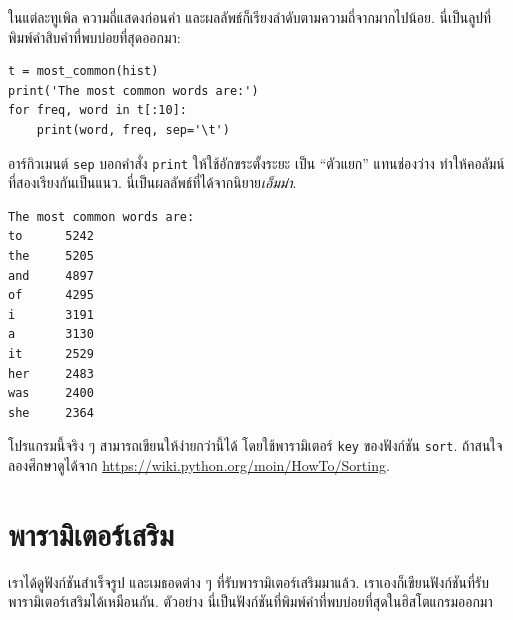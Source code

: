 
ในแต่ละทูเพิล ความถี่แสดงก่อนคำ 
และผลลัพธ์ก็เรียงลำดับตามความถี่จากมากไปน้อย.
นี่เป็นลูปที่พิมพ์คำสิบคำที่พบบ่อยที่สุดออกมา:

\begin{verbatim}
t = most_common(hist)
print('The most common words are:')
for freq, word in t[:10]:
    print(word, freq, sep='\t')
\end{verbatim}
%
%
อาร์กิวเมนต์ \texttt{sep} บอกคำสั่ง \texttt{print} ให้ใช้อักขระตั้งระยะ
เป็น ``ตัวแยก'' แทนช่องว่าง
ทำให้คอลัมน์ที่สองเรียงกันเป็นแนว.
นี่เป็นผลลัพธ์ที่ได้จากนิยาย\textit{เอ็มม่า}. 

\begin{verbatim}
The most common words are:
to      5242
the     5205
and     4897
of      4295
i       3191
a       3130
it      2529
her     2483
was     2400
she     2364
\end{verbatim}
%
%
โปรแกรมนี้จริง ๆ สามารถเขียนให้ง่ายกว่านี้ได้ โดยใช้พารามิเตอร์ \texttt{key} ของฟังก์ชัน \texttt{sort}.
ถ้าสนใจ ลองศึกษาดูได้จาก \url{https://wiki.python.org/moin/HowTo/Sorting}.

\section{พารามิเตอร์เสริม}


เราได้ดูฟังก์ชันสำเร็จรูป และเมธอดต่าง ๆ
ที่รับพารามิเตอร์เสริมมาแล้ว.
เราเองก็เขียนฟังก์ชันที่รับพารามิเตอร์เสริมได้เหมือนกัน.
ตัวอย่าง นี่เป็นฟังก์ชันที่พิมพ์คำที่พบบ่อยที่สุดในฮิสโตแกรมออกมา


